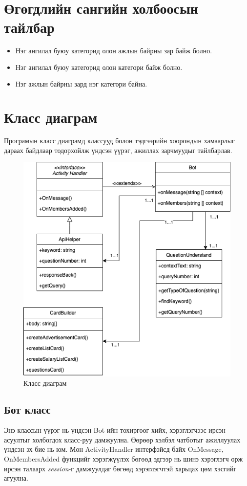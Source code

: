 \section{Өгөгдлийн сангийн холбоосын тайлбар}
\begin{itemize}
  \item Нэг ангилал буюу категорид олон ажлын байрны зар байж болно.
  \item Нэг ангилал буюу категорид олон категори байж болно. 
  \item Нэг ажлын байрны зард нэг категори байна.
\end{itemize}

\section{Класс диаграм}
Програмын класс диаграмд классууд болон тэдгээрийн хоорондын хамаарлыг дараах байдлаар тодорхойлж үндсэн үүрэг, ажиллах зарчмуудыг тайлбарлав.
\begin{figure}[ht]
  \centering
  \includegraphics[width = \textwidth-2cm]{images/classDiagram.png}
  \caption{Класс диаграм} \label{fig:classDiagram}
\end{figure}
\subsection{Бот класс}
Энэ классын үүрэг нь үндсэн Bot-ийн тохиргоог хийх, хэрэглэгчээс ирсэн асуултыг холбогдох класс-руу дамжуулна. Өөрөөр хэлбэл чатботыг ажиллуулах үндсэн эх бие нь юм. Мөн ActivityHandler интерфэйсд байх OnMessage, OnMembersAdded функцийг хэрэгжүүлэх бөгөөд эдгээр нь шинэ хэрэглэгч орж ирсэн талаарх \textit{session}-г дамжуулдаг бөгөөд хэрэглэгчтэй харьцах цөм хэсгийг агуулна.
